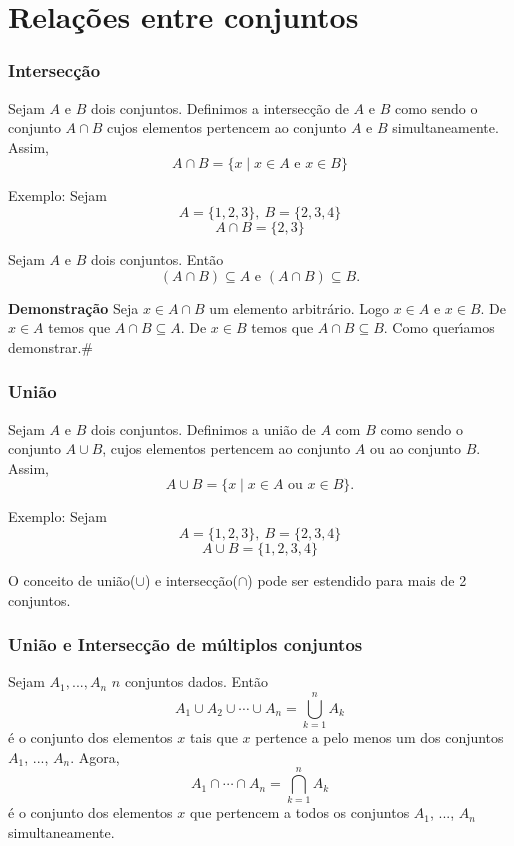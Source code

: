 \section{Rela{\c c}{\~o}es entre conjuntos}

\subsubsection{Intersec{\c c}{\~a}o}

\begin{definicao}[Intersec{\c c}{\~a}o] Sejam $A$ e $B$ dois conjuntos. Definimos a intersec{\c c}{\~a}o de $A$ e $B$ como sendo o conjunto $A \cap B$ cujos elementos pertencem ao conjunto $A$ e $B$ simultaneamente. Assim,
\[ A \cap B = \{x \mid x \in A\mbox{ e }  x \in B\}\]
\end{definicao}

Exemplo: Sejam
\[ A = \{1,2,3\},\ B = \{2,3,4\}\]
\[A \cap B = \{2,3\}\]

\begin{proposicao} Sejam $A$ e $B$ dois conjuntos. Ent{\~a}o
\[(A \cap B) \subseteq A  \mbox{ e } (A \cap B) \subseteq B.\]
\end{proposicao}

\textbf{Demonstra{\c c}{\~a}o} Seja $x \in A \cap B$ um elemento arbitr{\'a}rio. Logo $x \in A$ e $x \in B$. De $x \in A$ temos que $A \cap B \subseteq A$. De $x \in B$ temos que $A \cap B \subseteq B$. Como quer{\'\i}amos demonstrar.\#

\subsubsection{Uni{\~a}o}

\begin{definicao}[Uni{\~a}o] Sejam $A$ e $B$ dois conjuntos. Definimos a uni{\~a}o de $A$ com $B$ como sendo o conjunto $A \cup B$, cujos elementos pertencem ao conjunto $A$ ou ao conjunto $B$. Assim,
\[A \cup B = \{x \mid x \in A \mbox{ ou } x \in B\}.\]
\end{definicao}

Exemplo: Sejam
\[A = \{1,2,3\},\ B = \{2,3,4\}\]
\[A \cup B = \{1,2,3,4\}\]

O conceito de uni{\~a}o($ \cup $) e intersec{\c c}{\~a}o($ \cap $) pode ser estendido para mais de 2 conjuntos.

\subsubsection{Uni{\~a}o e Intersec{\c c}{\~a}o de m{\'u}ltiplos conjuntos}
\begin{definicao} Sejam $A_{1},...,A_{n}$ $n$ conjuntos dados. Ent{\~a}o
\[A_{1} \cup A_{2} \cup \cdots \cup A_{n}= \displaystyle\bigcup_{k=1}^{n} A_{k}\]
{\'e} o conjunto dos elementos $x$ tais que $x$ pertence a pelo menos um dos conjuntos $A_{1}$, ..., $A_{n}$. Agora,
\[A_{1} \cap \cdots \cap A_{n} = \displaystyle\bigcap_{k=1}^{n}A_{k}\]
{\'e} o conjunto dos elementos $x$ que pertencem a todos os conjuntos $A_{1}$, ..., $A_{n}$ simultaneamente.
\end{definicao}

